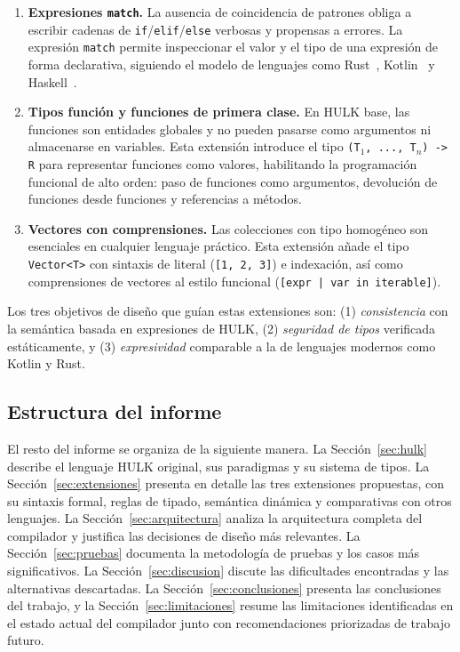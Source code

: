 \documentclass[12pt, a4paper]{article}
\begin{document}
\begin{enumerate}[leftmargin=*, label=\arabic*.]
    \item \textbf{Expresiones \texttt{match}.}
    La ausencia de coincidencia de patrones obliga a escribir cadenas de
    \texttt{if}/\texttt{elif}/\texttt{else} verbosas y propensas a errores.
    La expresión \texttt{match} permite inspeccionar el valor y el tipo de una
    expresión de forma declarativa, siguiendo el modelo de lenguajes como Rust~\cite{klabnik2019},
    Kotlin~\cite{jemerov2017} y Haskell~\cite{marlow2010}.

    \item \textbf{Tipos función y funciones de primera clase.}
    En HULK base, las funciones son entidades globales y no pueden pasarse como
    argumentos ni almacenarse en variables. Esta extensión introduce el tipo
    \texttt{(T$_1$, ..., T$_n$) -> R} para representar funciones como valores,
    habilitando la programación funcional de alto orden: paso de funciones como
    argumentos, devolución de funciones desde funciones y referencias a métodos.

    \item \textbf{Vectores con comprensiones.}
    Las colecciones con tipo homogéneo son esenciales en cualquier lenguaje
    práctico. Esta extensión añade el tipo \texttt{Vector<T>} con sintaxis de
    literal (\texttt{[1, 2, 3]}) e indexación, así como comprensiones de vectores
    al estilo funcional (\texttt{[expr | var in iterable]}).
\end{enumerate}

Los tres objetivos de diseño que guían estas extensiones son: (1)
\textit{consistencia} con la semántica basada en expresiones de HULK,
(2) \textit{seguridad de tipos} verificada estáticamente, y (3)
\textit{expresividad} comparable a la de lenguajes modernos como Kotlin y Rust.

\subsection{Estructura del informe}

El resto del informe se organiza de la siguiente manera. La
Sección~\ref{sec:hulk} describe el lenguaje HULK original, sus paradigmas y su
sistema de tipos. La Sección~\ref{sec:extensiones} presenta en detalle las tres
extensiones propuestas, con su sintaxis formal, reglas de tipado, semántica
dinámica y comparativas con otros lenguajes. La Sección~\ref{sec:arquitectura}
analiza la arquitectura completa del compilador y justifica las decisiones de
diseño más relevantes. La Sección~\ref{sec:pruebas} documenta la metodología de
pruebas y los casos más significativos. La Sección~\ref{sec:discusion} discute
las dificultades encontradas y las alternativas descartadas. La
Sección~\ref{sec:conclusiones} presenta las conclusiones del trabajo, y la
Sección~\ref{sec:limitaciones} resume las limitaciones identificadas en el
estado actual del compilador junto con recomendaciones priorizadas de trabajo
futuro.
\end{document}
